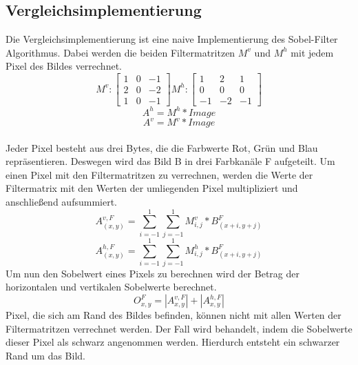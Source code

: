\documentclass[course=erap]{aspdoc}
\begin{document}
\subsection{Vergleichsimplementierung}
Die Vergleichsimplementierung ist eine naive Implementierung des Sobel-Filter Algorithmus.
Dabei werden die beiden Filtermatritzen $M^{v}$ und $M^{h}$ mit jedem Pixel des Bildes verrechnet.
\begin{equation}
    M^{v} :
    \begin{bmatrix}
        1 & 0 & -1 \\
        2 & 0 & -2 \\
        1 & 0 & -1
    \end{bmatrix}
    M^{h} :
    \begin{bmatrix}
        1 & 2 & 1 \\
        0 & 0 & 0 \\
        -1 & -2 & -1
    \end{bmatrix}
\end{equation}
\begin{equation}
    A^{h} = M^{h} * Image
\end{equation}
\begin{equation}
    A^{v} = M^{v} * Image
\end{equation} \\
Jeder Pixel besteht aus drei Bytes, die die Farbwerte Rot, Grün und Blau repräsentieren.
Deswegen wird das Bild B in drei Farbkanäle F aufgeteilt.
Um einen Pixel mit den Filtermatritzen zu verrechnen, werden die Werte der Filtermatrix mit den Werten der umliegenden Pixel multipliziert und anschließend aufsummiert.
\begin{equation}
    A_(x,y)^{v,F} = \sum_{i=-1}^{1} \sum_{j=-1}^{1} M^{v}_{i,j} * B_{(x+i,y+j)}^{F}
\end{equation}
\begin{equation}
    A_(x,y)^{h,F} = \sum_{i=-1}^{1} \sum_{j=-1}^{1} M^{h}_{i,j} * B_{(x+i,y+j)}^{F}
\end{equation}
Um nun den Sobelwert eines Pixels zu berechnen wird der Betrag der horizontalen und vertikalen Sobelwerte berechnet.
\begin{equation}
    O^{F}_{x,y} = \left | A^{v,F}_{x,y} \right | + \left | A^{h,F}_{x,y} \right |
    \label{eq:betrag}
\end{equation}
Pixel, die sich am Rand des Bildes befinden, können nicht mit allen Werten der Filtermatritzen verrechnet werden.
Der Fall wird behandelt, indem die Sobelwerte dieser Pixel als schwarz angenommen werden. Hierdurch entsteht ein schwarzer Rand um das Bild.
\end{document}
